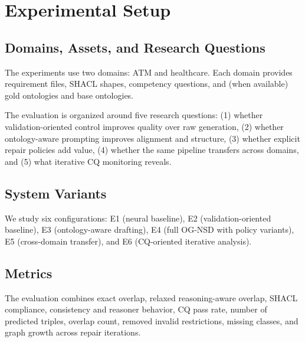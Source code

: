 \section{Experimental Setup}
\subsection{Domains, Assets, and Research Questions}
The experiments use two domains: ATM and healthcare. Each domain provides requirement files, SHACL shapes, competency questions, and (when available) gold ontologies and base ontologies.

The evaluation is organized around five research questions: (1) whether validation-oriented control improves quality over raw generation, (2) whether ontology-aware prompting improves alignment and structure, (3) whether explicit repair policies add value, (4) whether the same pipeline transfers across domains, and (5) what iterative CQ monitoring reveals.

\subsection{System Variants}
We study six configurations: E1 (neural baseline), E2 (validation-oriented baseline), E3 (ontology-aware drafting), E4 (full OG-NSD with policy variants), E5 (cross-domain transfer), and E6 (CQ-oriented iterative analysis).

\subsection{Metrics}
The evaluation combines exact overlap, relaxed reasoning-aware overlap, SHACL compliance, consistency and reasoner behavior, CQ pass rate, number of predicted triples, overlap count, removed invalid restrictions, missing classes, and graph growth across repair iterations.
